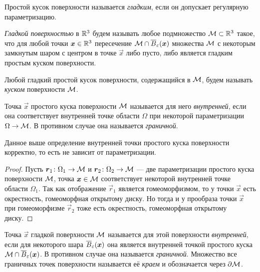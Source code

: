 \begin{definition}
	Простой кусок поверхности называется \textit{гладким}, если он допускает регулярную параметризацию.

	\textit{Гладкой поверхностью} в $\mathbb{R}^3$ будем называть любое подмножество $\mathcal{M} \subset \mathbb{R}^3$ такое, что для любой точки $\boldsymbol{x} \in \mathbb{R}^3$ пересечение $\mathcal{M} \cap \overline{B}_\varepsilon(\boldsymbol{x})$ множества $\mathcal{M}$ с некоторым замкнутым шаром с центром в точке $\vec{x}$ либо пусто, либо является гладким простым куском поверхности.

	Любой гладкий простой кусок поверхности, содержащийся в $\mathcal{M}$, будем называть \textit{куском} поверхности $\mathcal{M}$.
\end{definition}

\begin{definition}
	Точка $\vec{x}$ простого куска поверхности $\mathcal{M}$ называется для него \textit{внутренней}, если она соответствует внутренней точке области $\Omega$ при некоторой параметризации $\Omega \to \mathcal{M}$. В противном случае она называется \textit{граничной}.
\end{definition}

\begin{proposition}
	Данное выше определение внутренней точки простого куска поверхности корректно, то есть не зависит от параметризации.
\end{proposition}

\begin{proof}
	Пусть $\boldsymbol{r}_1\colon \Omega_1 \to \mathcal{M}$ и $\boldsymbol{r}_2\colon \Omega_2 \to \mathcal{M}$ --- две параметризации простого куска поверхности $\mathcal{M}$, точка $\boldsymbol{x} \in \mathcal{M}$ соответствует некоторой внутренней точке области $\Omega_1$. Так как отображение $\vec{r}_1$ является гомеоморфизмом, то у точки $\vec{x}$ есть окрестность, гомеоморфная открытому диску. Но тогда и у прообраза точки $\vec{x}$ при гомеоморфизме $\vec{r}_2$ тоже есть окрестность, гомеоморфная открытому диску.
\end{proof}

\begin{definition}
	Точка $\vec{x}$ гладкой поверхности $\mathcal{M}$ называется для этой поверхности \textit{внутренней}, если для некоторого шара $\overline{B}_\varepsilon(\boldsymbol{x})$ она является внутренней точкой простого куска $\mathcal{M} \cap \overline{B}_\varepsilon(\boldsymbol{x})$. В противном случае она называется \textit{граничной}. Множество все граничных точек поверхности называется её \textit{краем} и обозначается через $\partial\mathcal{M}$.
\end{definition}

